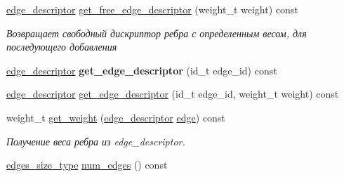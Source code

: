 \begin{DoxyCompactItemize}
\mbox{\label{class_s_p_u___g_r_a_p_h_1_1_spu_ultra_graph_a2575209b0a91ff66d45554a9d3733eb9}} 
\hyperlink{class_s_p_u___g_r_a_p_h_1_1_spu_ultra_graph_a5f3776e003ef0a1648f1d9f84289810b}{edge\+\_\+descriptor} \hyperlink{class_s_p_u___g_r_a_p_h_1_1_spu_ultra_graph_a2575209b0a91ff66d45554a9d3733eb9}{get\+\_\+free\+\_\+edge\+\_\+descriptor} (weight\+\_\+t weight) const
\begin{DoxyCompactList}\small\item\em Возвращает свободный дискриптор ребра с определенным весом, для последующего добавления \end{DoxyCompactList}\item 
\mbox{\label{class_s_p_u___g_r_a_p_h_1_1_spu_ultra_graph_a4c75efb2d557d1e54d9881e38a42bf9b}} 
\hyperlink{class_s_p_u___g_r_a_p_h_1_1_spu_ultra_graph_a5f3776e003ef0a1648f1d9f84289810b}{edge\+\_\+descriptor} {\bfseries get\+\_\+edge\+\_\+descriptor} (id\+\_\+t edge\+\_\+id) const
\item 
\hyperlink{class_s_p_u___g_r_a_p_h_1_1_spu_ultra_graph_a5f3776e003ef0a1648f1d9f84289810b}{edge\+\_\+descriptor} \hyperlink{class_s_p_u___g_r_a_p_h_1_1_spu_ultra_graph_a42c69c77768c92f5b4c657289ef1b129}{get\+\_\+edge\+\_\+descriptor} (id\+\_\+t edge\+\_\+id, weight\+\_\+t weight) const
\item 
\mbox{\label{class_s_p_u___g_r_a_p_h_1_1_spu_ultra_graph_a74eeded7f53b4a4d18bd1519fcce8086}} 
weight\+\_\+t \hyperlink{class_s_p_u___g_r_a_p_h_1_1_spu_ultra_graph_a74eeded7f53b4a4d18bd1519fcce8086}{get\+\_\+weight} (\hyperlink{class_s_p_u___g_r_a_p_h_1_1_spu_ultra_graph_a5f3776e003ef0a1648f1d9f84289810b}{edge\+\_\+descriptor} \hyperlink{class_s_p_u___g_r_a_p_h_1_1_spu_ultra_graph_a51468aa2278d3abb0c338ffbeac7747a}{edge}) const
\begin{DoxyCompactList}\small\item\em Получение веса ребра из edge\+\_\+descriptor. \end{DoxyCompactList}\item 
\mbox{\label{class_s_p_u___g_r_a_p_h_1_1_spu_ultra_graph_ae7b8a89aa7b971f90018194e11e57c2b}} 
\hyperlink{class_s_p_u___g_r_a_p_h_1_1_spu_ultra_graph_a82496f8d87c7dfab766f15a989a05aa4}{edges\+\_\+size\+\_\+type} \hyperlink{class_s_p_u___g_r_a_p_h_1_1_spu_ultra_graph_ae7b8a89aa7b971f90018194e11e57c2b}{num\+\_\+edges} () const

\end{DoxyCompactItemize}
